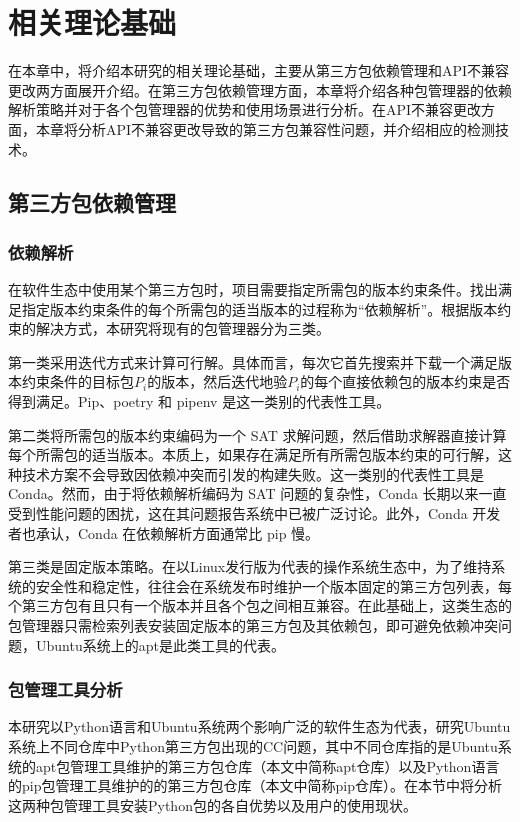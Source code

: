 \chapter{相关理论基础}
在本章中，将介绍本研究的相关理论基础，主要从第三方包依赖管理和API不兼容更改两方面展开介绍。在第三方包依赖管理方面，本章将介绍各种包管理器的依赖解析策略并对于各个包管理器的优势和使用场景进行分析。在API不兼容更改方面，本章将分析API不兼容更改导致的第三方包兼容性问题，并介绍相应的检测技术。

\section{第三方包依赖管理}
\subsection{依赖解析}\label{2.1.1}
在软件生态中使用某个第三方包时，项目需要指定所需包的版本约束条件。找出满足指定版本约束条件的每个所需包的适当版本的过程称为“依赖解析”。根据版本约束的解决方式，本研究将现有的包管理器分为三类。

第一类采用迭代方式来计算可行解。具体而言，每次它首先搜索并下载一个满足版本约束条件的目标包$P_{i}$的版本，然后迭代地验$P_{i}$的每个直接依赖包的版本约束是否得到满足。Pip、poetry 和 pipenv 是这一类别的代表性工具。

第二类将所需包的版本约束编码为一个 SAT 求解问题，然后借助求解器直接计算每个所需包的适当版本。本质上，如果存在满足所有所需包版本约束的可行解，这种技术方案不会导致因依赖冲突而引发的构建失败。这一类别的代表性工具是 Conda。然而，由于将依赖解析编码为 SAT 问题的复杂性，Conda 长期以来一直受到性能问题的困扰，这在其问题报告系统中已被广泛讨论。此外，Conda 开发者也承认，Conda 在依赖解析方面通常比 pip 慢。

第三类是固定版本策略。在以Linux发行版为代表的操作系统生态中，为了维持系统的安全性和稳定性，往往会在系统发布时维护一个版本固定的第三方包列表，每个第三方包有且只有一个版本并且各个包之间相互兼容。在此基础上，这类生态的包管理器只需检索列表安装固定版本的第三方包及其依赖包，即可避免依赖冲突问题，Ubuntu系统上的apt是此类工具的代表。

\subsection{包管理工具分析}
本研究以Python语言和Ubuntu系统两个影响广泛的软件生态为代表，研究Ubuntu系统上不同仓库中Python第三方包出现的CC问题，其中不同仓库指的是Ubuntu系统的apt包管理工具维护的第三方包仓库（本文中简称apt仓库）以及Python语言的pip包管理工具维护的的第三方包仓库（本文中简称pip仓库）。在本节中将分析这两种包管理工具安装Python包的各自优势以及用户的使用现状。

